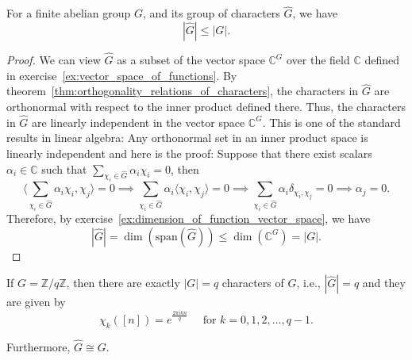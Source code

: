 \documentclass{elegantbook}
\begin{document}
\begin{corollary} \label{cor:number_of_characters_at_most_order_of_group}
  For a finite abelian group $G$, and its group of characters $\widehat{G}$, we have
  \[
    |\widehat{G}| \leq |G|.
  \]
\end{corollary}

\begin{proof}
  We can view $\widehat{G}$ as a subset of the vector space $\mathbb{C}^{G}$ over the field $\mathbb{C}$ defined in exercise~\ref{ex:vector_space_of_functions}. 
  By theorem~\ref{thm:orthogonality_relations_of_characters}, the characters in $\widehat{G}$ are orthonormal with respect to the inner product defined there. Thus, the characters in $\widehat{G}$ are linearly independent in the vector space $\mathbb{C}^{G}$. This is one of the standard results in linear algebra: Any orthonormal set in an inner product space is linearly independent and here is the proof:
  Suppose that there exist scalars $\alpha_i\in\mathbb{C}$ such that $\sum_{\chi_i\in \widehat{G}} \alpha_i \chi_i = 0$, then
  \[
    \langle \sum_{\chi_i\in \widehat{G}} \alpha_i \chi_i, \chi_j \rangle = 0 \implies \sum_{\chi_i\in \widehat{G}} \alpha_i \langle \chi_i, \chi_j \rangle = 0 \implies \sum_{\chi_i\in \widehat{G}} \alpha_i \delta_{\chi_i,\chi_j} = 0 \implies \alpha_j = 0.
  \]
  Therefore, by exercise~\ref{ex:dimension_of_function_vector_space}, we have
  \[
    |\widehat{G}| = \dim(\text{span}(\widehat{G})) \leq \dim(\mathbb{C}^{G}) = |G|.
  \]
\end{proof}

\begin{theorem} \label{thm:number_of_characters_of_cyclic_group_and_dirichlet_characters}
  If $G = \mathbb{Z}/q\mathbb{Z}$, then there are exactly $|G| = q$ characters of $G$, i.e., $|\widehat{G}| = q$ and they are given by
  \[
    \chi_k([n]) = e^{\frac{2\pi i k n}{q}} \quad \text{ for } k = 0, 1, 2, \ldots, q-1.
  \]
  
  Furthermore, $\widehat{G}\cong G$.
\end{theorem}
\end{document}
